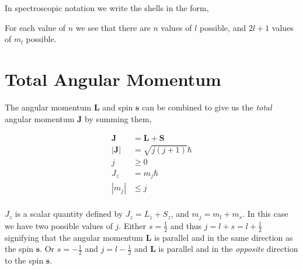 \documentclass[11pt]{amsart}
\begin{document}

In spectroscopic notation we write the shells in the form,


For each value of $n$ we see that there are $n$ values of $l$ possible, and $2l + 1$ values of $m_l$ possible.

\section{Total Angular Momentum}

The angular momentum $\mathbf{L}$ and spin $\mathbf{s}$ can be combined to give us the \textit{total} angular momentum $\mathbf{J}$ by summing them,

\begin{align*}
  \mathbf{J} &= \mathbf{L} + \mathbf{S} \\
  |\mathbf{J}| &= \sqrt{j(j+1)}\hbar \\
  j &\geq 0 \\
  J_z &= m_j \hbar \\
  |m_j| &\leq j \\
\end{align*}

$J_z$ is a scalar quantity defined by $J_z = L_z + S_z$, and $m_j = m_l + m_s$. In this case we have two possible values of $j$. Either $s = \frac{1}{2}$ and thus $j = l + s = l + \frac{1}{2}$ signifying that the angular momentum $\mathbf{L}$ is parallel and in the same direction as the spin $\mathbf{s}$. Or $s = -\frac{1}{2}$ and $j = l - \frac{1}{2}$ and $\mathbf{L}$ is parallel and in the \textit{opposite} direction to the spin $\mathbf{s}$.
\end{document}
